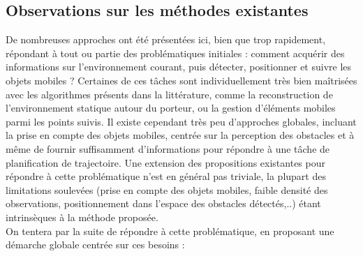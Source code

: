 \subsection{Observations sur les méthodes existantes}
De nombreuses approches ont été présentées ici, bien que trop rapidement, répondant à tout ou partie des problématiques initiales : comment acquérir des informations sur l'environnement courant, puis détecter, positionner et suivre les objets mobiles ? Certaines de ces tâches sont individuellement très bien maîtrisées avec les algorithmes présents dans la littérature, comme la reconstruction de l'environnement statique autour du porteur, ou la gestion d'éléments mobiles parmi les points suivis. Il existe cependant très peu d'approches globales, incluant la prise en compte des objets mobiles, centrée sur la perception des obstacles et à même de fournir suffisamment d'informations pour répondre à une tâche de planification de trajectoire. Une extension des propositions existantes pour répondre à cette problématique n'est en général pas triviale, la plupart des limitations soulevées (prise en compte des objets mobiles, faible densité des observations, positionnement dans l'espace des obstacles détectés,..) étant intrinsèques à la méthode proposée. \\

On tentera par la suite de répondre à cette problématique, en proposant une démarche globale centrée sur ces besoins :\\

